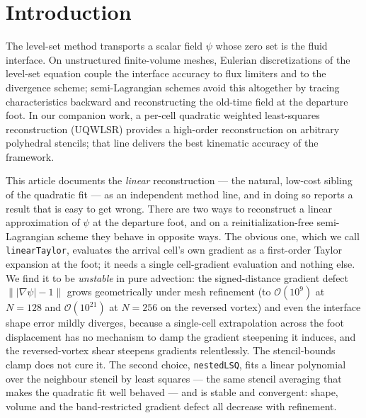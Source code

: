\documentclass[preprint,3p,11pt]{elsarticle}
\newcommand{\psilev}{\psi}
\begin{document}
\section{Introduction}
\label{sec:intro}

The level-set method \cite{osher1988,sethian1999,sussman1994} transports a
scalar field $\psilev$ whose zero set is the fluid interface. On unstructured
finite-volume meshes, Eulerian discretizations of the level-set equation
couple the interface accuracy to flux limiters and to the divergence scheme;
semi-Lagrangian schemes \cite{staniforth1991,strain1999} avoid this
altogether by tracing characteristics backward and reconstructing the
old-time field at the departure foot. In our companion work, a per-cell
quadratic weighted least-squares reconstruction (UQWLSR) provides a
high-order reconstruction on arbitrary polyhedral stencils; that line
delivers the best kinematic accuracy of the framework.

This article documents the \emph{linear} reconstruction --- the natural,
low-cost sibling of the quadratic fit --- as an independent method line, and
in doing so reports a result that is easy to get wrong. There are two ways to
reconstruct a linear approximation of $\psilev$ at the departure foot, and on
a reinitialization-free semi-Lagrangian scheme they behave in opposite ways.
The obvious one, which we call \texttt{linearTaylor}, evaluates the arrival
cell's own gradient as a first-order Taylor expansion at the foot; it needs a
single cell-gradient evaluation and nothing else. We find it to be
\emph{unstable} in pure advection: the signed-distance gradient defect
$\bigl\||\nabla\psilev|-1\bigr\|$ grows geometrically under mesh refinement
(to $\mathcal{O}(10^{9})$ at $N=128$ and $\mathcal{O}(10^{21})$ at $N=256$ on
the reversed vortex) and even the interface shape error mildly diverges,
because a single-cell extrapolation across the foot displacement has no
mechanism to damp the gradient steepening it induces, and the reversed-vortex
shear steepens gradients relentlessly. The stencil-bounds clamp does not cure
it. The second choice, \texttt{nestedLSQ}, fits a linear polynomial over the
neighbour stencil by least squares --- the same stencil averaging that makes
the quadratic fit well behaved --- and is stable and convergent: shape,
volume and the band-restricted gradient defect all decrease with refinement.
\end{document}
